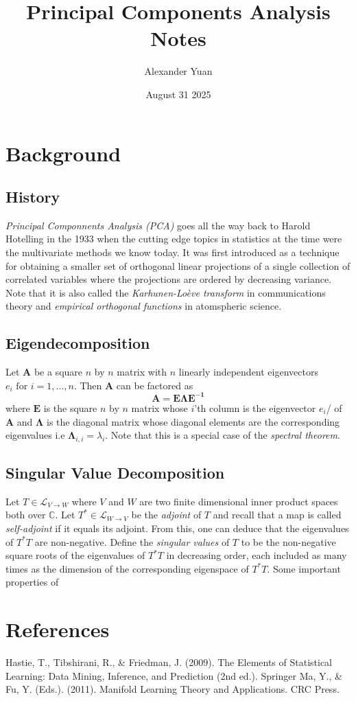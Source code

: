 \documentclass{article}
\title{Principal Components Analysis Notes}
\author{Alexander Yuan}
\date{August 31 2025}
\begin{document}
 
\maketitle

\section{Background}
\subsection{History}
\emph{Principal Componnents Analysis (PCA)} goes all the way back to Harold Hotelling in the 1933 when the cutting edge topics in statistics at the time were the multivariate methods we know today. It was first 
introduced as a technique for obtaining a smaller set of orthogonal linear projections of a single collection of correlated variables where the projections are ordered by decreasing variance. Note that it is also
called the \emph{Karhunen-Loève transform} in communications theory and \emph{empirical orthogonal functions} in atomspheric science.

\subsection{Eigendecomposition}
Let $\mathbf{A}$ be a square $n$ by $n$ matrix with $n$ linearly independent eigenvectors $e_i \text{ for } i = 1, \ldots , n$. Then $\mathbf{A}$ can be factored as 
$$
\mathbf{A = E \Lambda E^{-1}}
$$
where $\mathbf{E}$ is the square $n$ by $n$ matrix whose $i$'th column is the eigenvector $e_i$/ of $\mathbf{A}$ and $\mathbf{\Lambda}$ is the diagonal matrix whose diagonal elements are the corresponding eigenvalues 
i.e $\mathbf{\Lambda}_{i,i}= \lambda_i$. Note that this is a special case of the \emph{spectral theorem}.


\subsection{Singular Value Decomposition}
Let $T \in \mathcal{L}_{V \to W}$ where $V$ and $W$ are two finite dimensional inner product spaces both over $\mathbb{C}$. Let $T^* \in \mathcal{L}_{W \to V}$ be the \emph{adjoint} of $T$ and recall that a map is called \emph{self-adjoint} 
if it equals its adjoint. From this, one can deduce that the eigenvalues of $T^*T$ are non-negative. \newline \newline 
Define the \emph{singular values} of $T$ to be the non-negative square roots of the eigenvalues of $T^*T$ in decreasing order, 
each included as many times as the dimension of the corresponding eigenspace of $T^*T$. Some important properties of 


\section{References}
Hastie, T., Tibshirani, R., \& Friedman, J. (2009). The Elements of Statistical Learning: Data Mining, Inference, and Prediction (2nd ed.). Springer \newline \newline 
Ma, Y., \& Fu, Y. (Eds.). (2011). Manifold Learning Theory and Applications. CRC Press.
\end{document}
